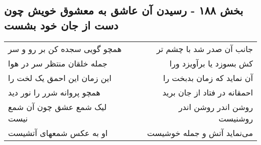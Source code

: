 \begin{center}
\section*{بخش ۱۸۸ - رسیدن آن عاشق به معشوق خویش چون دست از جان خود بشست}
\label{sec:sh188}
\begin{longtable}{l p{0.5cm} r}
همچو گویی سجده کن بر رو و سر
&&
جانب آن صدر شد با چشم تر
\\
جمله خلقان منتظر سر در هوا
&&
کش بسوزد یا برآویزد ورا
\\
این زمان این احمق یک لخت را
&&
آن نماید که زمان بدبخت را
\\
همچو پروانه شرر را نور دید
&&
احمقانه در فتاد از جان برید
\\
لیک شمع عشق چون آن شمع نیست
&&
روشن اندر روشن اندر روشنیست
\\
او به عکس شمعهای آتشیست
&&
می‌نماید آتش و جمله خوشیست
\\
\end{longtable}
\end{center}
